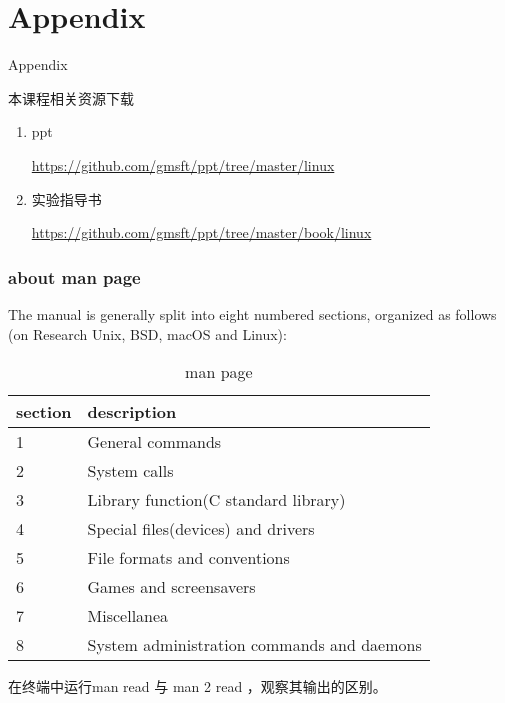 \documentclass{beamer}
\begin{document}
\section{Appendix}
\begin{frame}
\Huge{\centerline{Appendix}}
\end{frame}
\begin{frame}{本课程相关资源下载}
\begin{enumerate}
\item
ppt

\url{https://github.com/gmsft/ppt/tree/master/linux}
\item
实验指导书

\url{https://github.com/gmsft/ppt/tree/master/book/linux}
\end{enumerate}
\end{frame}
\begin{frame}
\frametitle{about man page}
The manual is generally split into eight numbered sections, organized as follows (on Research Unix, BSD, macOS and Linux):
\begin{table}
\begin{tabular}{ll}
\toprule
\textbf{section} & \textbf{description} \\
\midrule
1 & General commands\\
 2 & System calls\\
 3& Library function(C standard library)\\
 4 & Special files(devices) and drivers\\
  5 & File formats and conventions\\
  6  & Games and screensavers\\
   7  & Miscellanea\\
   8   & System administration commands and daemons\\  
\bottomrule
\end{tabular}
\caption{man page}
\end{table}

在终端中运行man read 与 man 2 read ，观察其输出的区别。
\end{frame}
\end{document}
